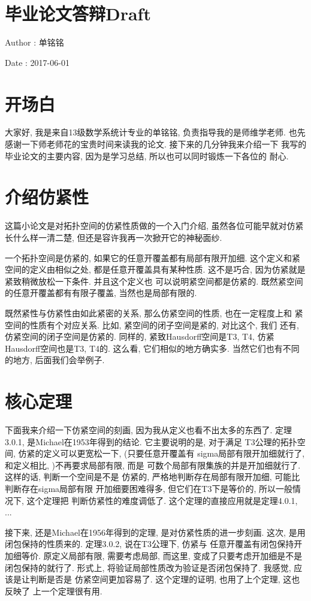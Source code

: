 \documentclass[a4paper,12pt]{ctexart}
\begin{document}
\section{毕业论文答辩Draft}
Author : 单铭铭

Date : 2017-06-01


\section{开场白}
大家好, 我是来自13级数学系统计专业的单铭铭, 负责指导我的是师维学老师.
也先感谢一下师老师花的宝贵时间来读我的论文. 接下来的几分钟我来介绍一下
我写的毕业论文的主要内容, 因为是学习总结, 所以也可以同时锻炼一下各位的
耐心. 

\section{介绍仿紧性}
这篇小论文是对拓扑空间的仿紧性质做的一个入门介绍, 虽然各位可能早就对仿紧
长什么样一清二楚, 但还是容许我再一次掀开它的神秘面纱.

一个拓扑空间是仿紧的, 如果它的任意开覆盖都有局部有限开加细.
这个定义和紧空间的定义由相似之处, 都是任意开覆盖具有某种性质.
这不是巧合, 因为仿紧就是紧致稍微放松一下条件. 并且这个定义也
可以说明紧空间都是仿紧的. 既然紧空间的任意开覆盖都有有限子覆盖,
当然也是局部有限的.

既然紧性与仿紧性由如此紧密的关系, 那么仿紧空间的性质, 也在一定程度上和
紧空间的性质有个对应关系. 比如, 紧空间的闭子空间是紧的, 对比这个, 我们
还有, 仿紧空间的闭子空间是仿紧的. 同样的, 紧致Hausdorff空间是T3, T4,
仿紧Hausdorff空间也是T3, T4的. 这么看, 它们相似的地方确实多.
当然它们也有不同的地方, 后面我们会举例子.

\section{核心定理}
下面我来介绍一下仿紧空间的刻画, 因为我从定义也看不出太多的东西了.
定理3.0.1, 是Michael在1953年得到的结论. 它主要说明的是, 对于满足
T3公理的拓扑空间, 仿紧的定义可以更宽松一下, (只要任意开覆盖有
sigma局部有限开加细就行了, 和定义相比, )不再要求局部有限, 而是
可数个局部有限集族的并是开加细就行了. 这样的话, 判断一个空间是不是
仿紧的, 严格地判断存在局部有限开加细, 可能比判断存在sigma局部有限
开加细要困难得多, 但它们在T3下是等价的, 所以一般情况下, 这个定理把
判断仿紧性的难度调低了. 这个定理的直接应用就是定理4.0.1, ...

接下来, 还是Michael在1956年得到的定理, 是对仿紧性质的进一步刻画.
这次, 是用闭包保持的性质来的. 定理3.0.2, 说在T3公理下, 仿紧与
任意开覆盖有闭包保持开加细等价. 原定义局部有限, 需要考虑局部,
而这里, 变成了只要考虑开加细是不是闭包保持的就行了. 形式上,
将验证局部性质改为验证是否闭包保持了. 我感觉, 应该是让判断是否是
仿紧空间更加容易了. 这个定理的证明, 也用了上个定理, 这也反映了
上一个定理很有用.
\end{document}
